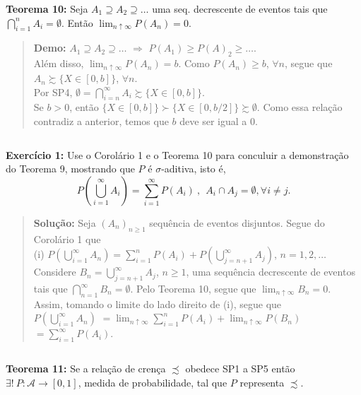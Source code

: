 \documentclass[
]{book}
\begin{document}
\(~\)

\textbf{Teorema 10:} Seja \(A_1 \supseteq A_2 \supseteq \ldots\) uma seq. decrescente de eventos tais que \(\bigcap_{i=1}^{n} A_i = \emptyset\). Então \(\displaystyle \lim_{n \uparrow \infty} P(A_n) = 0\).

\begin{quote}
\textbf{Demo:} \(A_1 \supseteq A_2 \supseteq \ldots\) \(\Rightarrow\) \(P(A_1) \geq P(A)_2 \geq \ldots\).\\
Além disso, \(\displaystyle \lim_{n \uparrow \infty} P(A_n) = b\). Como \(P(A_n) \geq b\), \(\forall n\), segue que \(A_n \succsim \{X \in [0,b]\}\), \(\forall n\).\\
Por SP4, \(\emptyset = \bigcap_{i=n}^{\infty} A_i \succsim \{X \in [0,b]\}\).\\
Se \(b>0\), então \(\{X \in [0,b]\} \succ \{X \in [0,b/2]\} \succsim \emptyset\). Como essa relação contradiz a anterior, temos que \(b\) deve ser igual a \(0\).
\end{quote}

\(~\)

\textbf{Exercício 1:}
Use o Corolário 1 e o Teorema 10 para conculuir a demonstração do Teorema 9, mostrando que \(P\) é \(\sigma\)-aditiva, isto é, \[P\left(\bigcup_{i=1}^{\infty} A_i\right) = \sum_{i=1}^{\infty} P\left(A_i\right) ~,~~ A_i \cap A_j = \emptyset, \forall i \neq j.\]

\begin{quote}
\textbf{Solução:} Seja \((A_n)_{n \geq 1}\) sequência de eventos disjuntos. Segue do Corolário 1 que\\
(i) \(\displaystyle P\left(\bigcup_{i=1}^{\infty} A_n\right) = \sum_{i=1}^{n} P\left(A_i\right) + P\left(\bigcup_{j=n+1}^{\infty} A_j\right)\), \(n=1,2,\ldots\)\\
Considere \(\displaystyle B_n=\bigcup_{j=n+1}^{\infty} A_j\), \(n \geq 1\), uma sequência decrescente de eventos tais que \(\displaystyle \bigcap_{n=1}^{\infty} B_n = \emptyset\). Pelo Teorema 10, segue que \(\displaystyle \lim_{n\uparrow \infty} B_n = 0\). Assim, tomando o limite do lado direito de (i), segue que\\
\(\displaystyle P\left(\bigcup_{i=1}^{\infty} A_n\right)\) \(=\displaystyle \lim_{n\uparrow \infty} \sum_{i=1}^{n} P\left(A_i\right) + \lim_{n\uparrow \infty} P\left(B_n\right)\) \(=\displaystyle \sum_{i=1}^{\infty} P\left(A_i\right)\).
\end{quote}

\(~\)

\textbf{Teorema 11:} Se a relação de crença \(\precsim\) obedece SP1 a SP5 então \(\exists !~ P: \mathcal{A} \rightarrow [0,1]\), medida de probabilidade, tal que \(P\) representa \(\precsim\).
\end{document}
